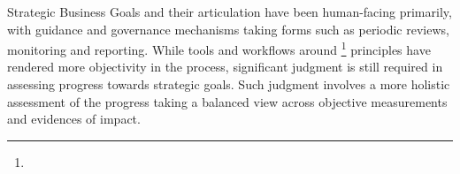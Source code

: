 %
%

Strategic Business Goals and their articulation have been human-facing primarily,
with guidance and governance mechanisms taking forms such as periodic reviews, monitoring and reporting.
While tools and workflows around \footnote{} principles
 have rendered more objectivity in the process, significant judgment is still
required in assessing progress towards strategic goals.
Such judgment involves a more holistic assessment of the progress taking a balanced view across objective measurements
and evidences of impact.
